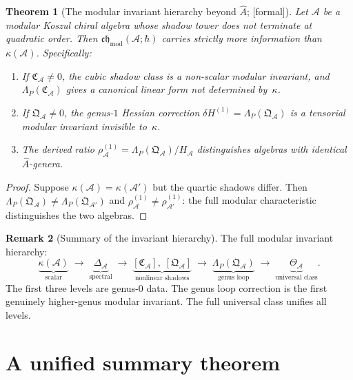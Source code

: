 \documentclass[11pt,oneside]{memoir}
\numberwithin{equation}{chapter}
\newtheorem{theorem}{Theorem}[chapter]
\theoremstyle{definition}
\newtheorem{remark}[theorem]{Remark}
\newcommand{\ClaimStatusProvedHere}{\textnormal{[formal]}}
\newcommand{\cA}{\mathcal A}
\begin{document}
\begin{theorem}[The modular invariant hierarchy beyond $\hat{A}$; \ClaimStatusProvedHere]
\label{thm:nms-beyond-ahat}
Let $\cA$ be a modular Koszul chiral algebra whose shadow tower does not terminate at quadratic order.  Then $\mathfrak{ch}_{\mathrm{mod}}(\cA;\hbar)$ carries strictly more information than $\kappa(\cA)$.  Specifically:
\begin{enumerate}[label=\textup{(\roman*)}]
\item If $\mathfrak C_{\cA}\neq 0$, the cubic shadow class is a non-scalar modular invariant, and $\Lambda_P(\mathfrak C_{\cA})$ gives a canonical linear form not determined by~$\kappa$.
\item If $\mathfrak Q_{\cA}\neq 0$, the genus-$1$ Hessian correction $\delta H^{(1)}=\Lambda_P(\mathfrak Q_{\cA})$ is a tensorial modular invariant invisible to~$\kappa$.
\item The derived ratio $\rho^{(1)}_{\cA}=\Lambda_P(\mathfrak Q_{\cA})/H_{\cA}$ distinguishes algebras with identical $\hat{A}$-genera.
\end{enumerate}
\end{theorem}

\begin{proof}
Suppose $\kappa(\cA)=\kappa(\cA')$ but the quartic shadows differ.  Then $\Lambda_P(\mathfrak Q_{\cA})\neq \Lambda_P(\mathfrak Q_{\cA'})$ and $\rho^{(1)}_{\cA}\neq \rho^{(1)}_{\cA'}$: the full modular characteristic distinguishes the two algebras.\qedhere
\end{proof}

\begin{remark}[Summary of the invariant hierarchy]
\label{rem:nms-invariant-hierarchy-summary}
The full modular invariant hierarchy:
\[
\underbrace{\kappa(\cA)}_{\text{scalar}}
\;\longrightarrow\;
\underbrace{\Delta_{\cA}}_{\text{spectral}}
\;\longrightarrow\;
\underbrace{[\mathfrak C_{\cA}],\;[\mathfrak Q_{\cA}]}_{\text{nonlinear shadows}}
\;\longrightarrow\;
\underbrace{\Lambda_P(\mathfrak Q_{\cA})}_{\text{genus loop}}
\;\longrightarrow\;
\underbrace{\Theta_{\cA}}_{\text{universal class}}.
\]
The first three levels are genus-$0$ data.  The genus loop correction is the first genuinely higher-genus modular invariant.  The full universal class unifies all levels.
\end{remark}

\section{A unified summary theorem}
\label{sec:nms-summary-theorem}
\end{document}
